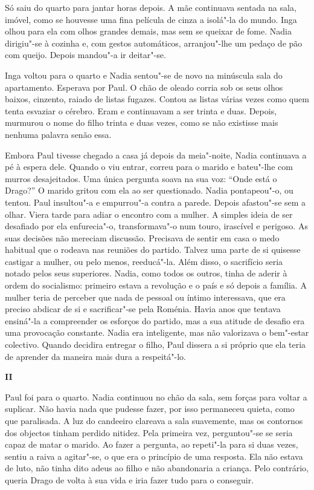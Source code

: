 Só saiu do quarto para jantar horas depois. A mãe continuava sentada
na sala, imóvel, como se houvesse uma fina película de cinza a isolá"-la
do mundo. Inga olhou para ela com olhos grandes demais, mas sem se
queixar de fome. Nadia dirigiu"-se à cozinha e, com gestos automáticos,
arranjou"-lhe um pedaço de pão com queijo. Depois mandou"-a ir deitar"-se.

Inga voltou para o quarto e Nadia sentou"-se de novo na minúscula sala do
apartamento. Esperava por Paul. O chão de oleado corria sob os seus
olhos baixos, cinzento, raiado de listas fugazes. Contou as listas
várias vezes como quem tenta esvaziar o cérebro. Eram e continuavam a
ser trinta e duas. Depois, murmurou o nome do filho trinta e duas vezes,
como se não existisse mais nenhuma palavra senão essa.

Embora Paul tivesse chegado a casa já depois da meia"-noite, Nadia continuava a pé à espera dele. Quando o viu entrar, correu
para o marido e bateu"-lhe com murros desajeitados. Uma única pergunta
soava na sua voz: ``Onde está o Drago?'' O marido gritou com ela ao ser
questionado. Nadia pontapeou"-o, ou tentou. Paul insultou"-a e
empurrou"-a contra a parede. Depois afastou"-se sem a olhar. Viera tarde
para adiar o encontro com a mulher. A simples ideia de ser desafiado por
ela enfurecia"-o, transformava"-o num touro, irascível e perigoso. As suas
decisões não mereciam discussão. Precisava de sentir em
casa o medo habitual que o rodeava nas reuniões do partido. Talvez uma
parte de si quisesse castigar a mulher, ou pelo menos, reeducá"-la. Além
disso, o sacrifício seria notado pelos seus superiores. Nadia, como
todos os outros, tinha de aderir à ordem do socialismo: primeiro estava
a revolução e o país e só depois a família. A mulher teria de perceber
que nada de pessoal ou íntimo interessava, que era preciso abdicar de
si e sacrificar"-se pela Roménia. Havia anos que tentava ensiná"-la a
compreender os esforços do partido, mas a sua atitude de desafio era uma
provocação constante. Nadia era inteligente, mas não valorizava o
bem"-estar colectivo. Quando decidira entregar o filho, Paul dissera a
si próprio que ela teria de aprender da maneira mais dura a
respeitá"-lo.


\pagebreak
\thispagestyle{empty}
\movetooddpage
\vspace*{1.8cm}
\noindent{}\textbf{II}

\bigskip


Paul foi para o quarto. Nadia continuou no chão da sala, sem forças para
voltar a suplicar. Não havia nada que pudesse fazer, por isso permaneceu
quieta, como que paralisada. A luz do candeeiro clareava a sala
suavemente, mas os contornos dos objectos tinham perdido nitidez. Pela
primeira vez, perguntou"-se se seria capaz de matar o marido. Ao fazer a
pergunta, ao repeti"-la para si duas vezes, sentiu a raiva a agitar"-se, o
que era o princípio de uma resposta. Ela não estava de luto, não tinha
dito adeus ao filho e não abandonaria a criança. Pelo contrário, queria
Drago de volta à sua vida e iria fazer tudo para o conseguir.

